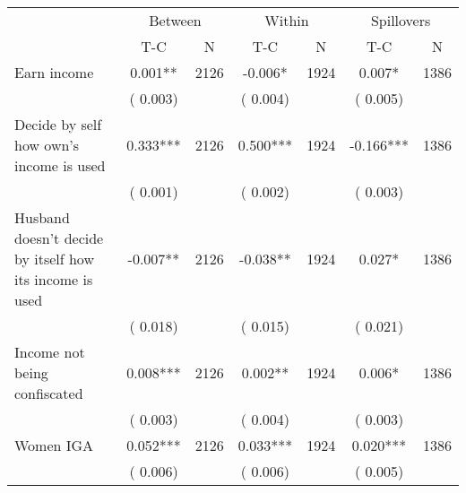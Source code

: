 
\begin{tabular}{l*{6}{c}}\hline&\multicolumn{2}{c}{Between}&\multicolumn{2}{c}{Within}&\multicolumn{2}{c}{Spillovers} \\ \cmidrule(r){2-3}\cmidrule(l){4-5}\cmidrule(l){6-7} & {T-C} & {N} & {T-C} & {N}  & {T-C}  & {N}  \\ \midrule
Earn income        &              0.001**      &       2126       &             -0.006*      &       1924       &              0.007*      &       1386       \\
                       &       (       0.003)            &                               &       (       0.004)            &                               &       (       0.005)            &                               \\
Decide by self how own's income is used        &              0.333***      &       2126       &              0.500***      &       1924       &             -0.166***      &       1386       \\
                       &       (       0.001)            &                               &       (       0.002)            &                               &       (       0.003)            &                               \\
Husband doesn't decide by itself how its income is used        &             -0.007**      &       2126       &             -0.038**      &       1924       &              0.027*      &       1386       \\
                       &       (       0.018)            &                               &       (       0.015)            &                               &       (       0.021)            &                               \\
Income not being confiscated        &              0.008***      &       2126       &              0.002**      &       1924       &              0.006*      &       1386       \\
                       &       (       0.003)            &                               &       (       0.004)            &                               &       (       0.003)            &                               \\
Women IGA        &              0.052***      &       2126       &              0.033***      &       1924       &              0.020***      &       1386       \\
                       &       (       0.006)            &                               &       (       0.006)            &                               &       (       0.005)            &                               \\
\hline \end{tabular}